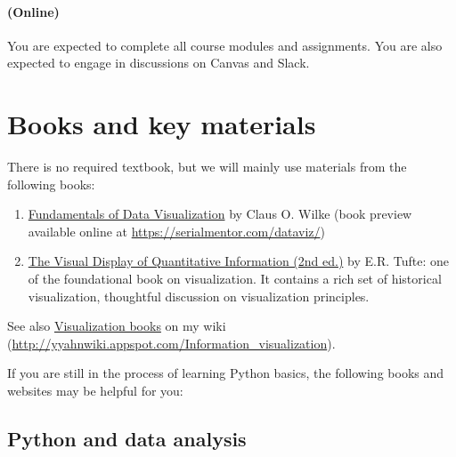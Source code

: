 \documentclass[11pt,article,oneside]{memoir} %
\begin{document}
\paragraph{(Online)} You are expected to complete all course modules and assignments. 
You are also expected to engage in discussions on Canvas and Slack. 

\section{Books and key materials}%

There is no required textbook, but we will mainly use materials from the following books:

\begin{enumerate}
    
\item \href{https://serialmentor.com/dataviz/}{Fundamentals of Data Visualization} by Claus O. Wilke (book preview available online at \url{https://serialmentor.com/dataviz/})

\item \href{http://www.amazon.com/gp/product/0961392142}{The Visual Display of Quantitative Information (2nd ed.)} by E.R. Tufte: one of the foundational book on visualization. It contains a rich set of historical visualization, thoughtful discussion on visualization principles. 

\end{enumerate}

See also \href{http://yyahnwiki.appspot.com/Information_visualization#h_6225eb5bf8a031f750a1b03f810ccc6a}{Visualization books} on my wiki (\url{http://yyahnwiki.appspot.com/Information_visualization}). 


If you are still in the process of learning Python basics, the following books and websites may be helpful for you:

\subsection{Python and data analysis}%
\end{document}
